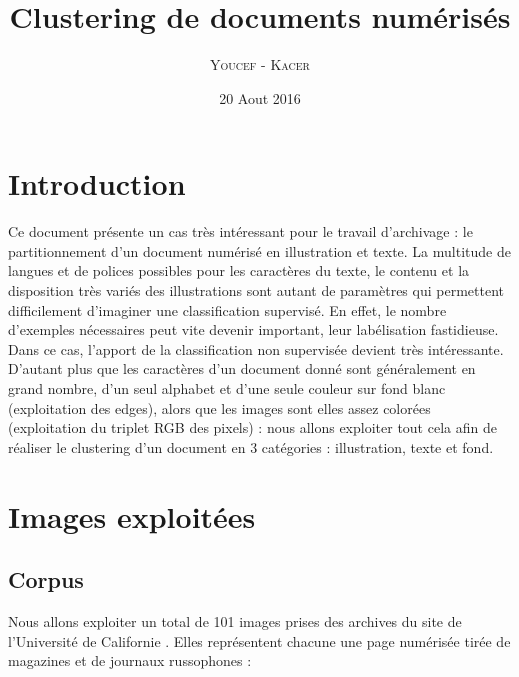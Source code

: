 \documentclass{book}
\title{Clustering de documents numérisés}
\author{\textsc{Youcef} - \textsc{Kacer}}
\date{20 Aout 2016}
\begin{document}
 
\maketitle

\tableofcontents

\frontmatter
\chapter{Introduction}
Ce document présente un cas très intéressant pour le travail d'archivage : le partitionnement d'un document numérisé en illustration et texte.
La multitude de langues et de polices possibles pour les caractères du texte, le contenu et la disposition très variés des illustrations sont 
autant de paramètres qui permettent difficilement d'imaginer une classification supervisé. En effet, le nombre d'exemples nécessaires peut vite devenir important,
leur labélisation fastidieuse.\\
Dans ce cas, l'apport de la classification non supervisée devient très intéressante. D'autant plus que les caractères d'un document donné sont généralement en grand 
nombre, d'un seul alphabet et d'une seule couleur sur fond blanc (exploitation des edges), alors que les images sont elles assez colorées (exploitation du triplet 
RGB des pixels) : nous allons exploiter tout cela afin de réaliser le clustering d'un document en 3 catégories : illustration, texte et fond.


\mainmatter
\chapter{Images exploitées}
\section{Corpus}\label{labelisation}
Nous allons exploiter un total de 101 images prises des archives du site de l'Université de Californie \cite{uci}. 
Elles représentent chacune une page numérisée tirée de magazines et de journaux russophones \cite{dataset} :
\end{document}
